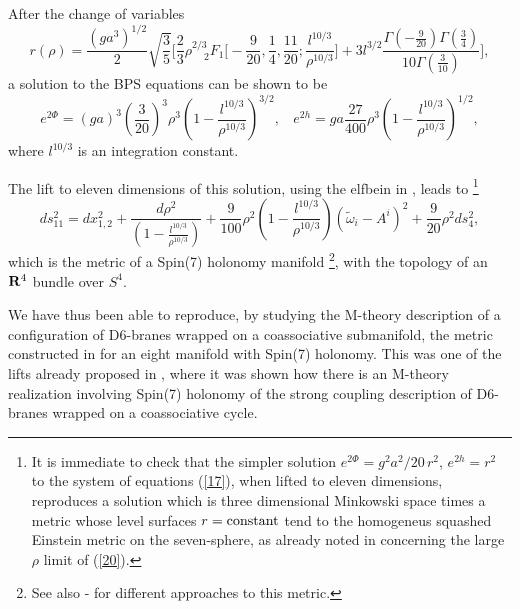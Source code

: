 \documentclass[12pt,a4paper]{article}
\begin{document}
After the change of variables
\begin{equation}
r(\rho) = \frac {(ga^3)^{1/2}}{2} \sqrt{\frac {3}{5}} \Big[ \frac {2}{3} \rho^{2/3}_{\: \quad 2} F_1 \big[ 
- \frac {9}{20}, \frac {1}{4}, \frac {11}{20}; \frac {l^{10/3}}{\rho^{10/3}} \big] + 
3 l^{3/2} \frac {\Gamma\left(-\frac {9}{20} \right) \Gamma\left( \frac {3}{4} \right)}{10 
\Gamma\left(\frac {3}{10} \right)} \Big],
\label{18}
\end{equation}
a solution to the BPS equations can be shown to be 
\begin{equation}
e^{2 \Phi} = (ga)^3 \left( \frac {3}{20} \right)^3 \! \rho^3 \left( 1 - \frac {l^{10/3}}{\rho^{10/3}} 
\right)^{3/2}, \: \: \: \: e^{2h} = ga\frac {27}{400} \rho^3 \left(1 - 
\frac {l^{10/3}}{\rho^{10/3}} 
\right)^{1/2},
\label{19}
\end{equation}
where $l^{10/3}$ is an integration constant.
  
The lift to eleven dimensions of this solution, using the elfbein in \cite{Salam}, leads to 
\footnote{It is immediate to check that the simpler solution $e^{2 \Phi} = g^2a^2/20 \, r^2$, 
$e^{2 h} = r^2$ to the system of equations (\ref{17}), when lifted to eleven dimensions, reproduces a 
solution which is three dimensional Minkowski space times a metric whose level surfaces 
$r=\hbox {constant}$ tend to the homogeneus squashed Einstein metric on the seven-sphere, 
as already noted in \cite{GPP} concerning the large $\rho$ limit of (\ref{20}).}
\begin{equation}
ds_{11}^2 = dx_{1,2}^2 + \frac {d \rho^2}{\left( 1 - \frac {l^{10/3}}{\rho^{10/3}} 
\right)} + \frac {9}{100} \rho^2 \left( 1 - \frac {l^{10/3}}{\rho^{10/3}} 
\right) (\tilde{\omega}_{i} - A^{i})^2 + \frac {9}{20} \rho^2 ds_4^2,
\label{20}
\end{equation}
which is the metric of a Spin(7) holonomy manifold \cite{BS,GPP} \footnote{See also 
\cite{Floratos}-\cite{Konishi} for different approaches to this metric.}, 
with the topology of an ${\bf R}^4$ bundle over $S^4$.
  
We have thus been able to reproduce, by studying the M-theory description of a 
configuration of D6-branes wrapped on a coassociative submanifold, the 
metric constructed in \cite{BS,GPP} for an eight manifold with Spin(7) holonomy. This 
was one of the lifts already proposed in \cite{Gomis}, where it was shown how 
there is an M-theory realization involving Spin(7) holonomy of the strong coupling 
description of D6-branes wrapped on a coassociative cycle. 
  
\end{document}
